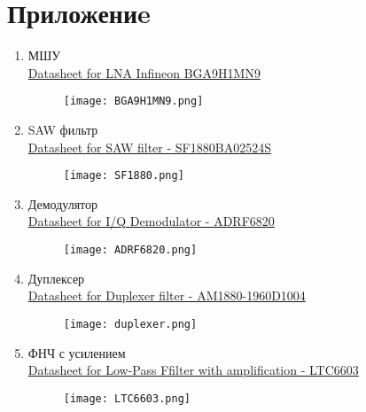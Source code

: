 \documentclass[a4paper,12pt]{article}
\begin{document}
 \newpage

\section{Приложениe}
\begin{enumerate}

\item  МШУ  \\
\href{https://www.alldatasheet.com/datasheet-pdf/view/1418778/INFINEON/BGA9H1MN9.html}{Datasheet for LNA Infineon BGA9H1MN9}
\begin{figure}[H]
    \centering
    \texttt{[image: BGA9H1MN9.png]}
    \label{fig:enter-label}
\end{figure}

\newpage

\item  SAW фильтр \\
\href{https://www.alldatasheet.com/datasheet-pdf/view/565351/APITECH/SF1880BA02524S.html}{Datasheet for SAW filter - SF1880BA02524S}
\begin{figure}[H]
    \centering
    \texttt{[image: SF1880.png]}
    \label{fig:enter-label}
\end{figure}


\newpage

\item  Демодулятор \\
\href{https://www.alldatasheet.com/html-pdf/902731/AD/ADRF6820ACPZ-R7/70/2/ADRF6820ACPZ-R7.html}{Datasheet for I/Q Demodulator  - ADRF6820}
\begin{figure}[H]
    \centering
    \texttt{[image: ADRF6820.png]}
    \label{fig:enter-label}
\end{figure}

\newpage

\item  Дуплексер \\
\href{https://www.everythingrf.com/products/duplexers/anatech-electronics/690-30-am1880-1960d1004}{Datasheet for Duplexer  filter - AM1880-1960D1004}
\begin{figure}[H]
    \centering
    \texttt{[image: duplexer.png]}
    \label{fig:enter-label}
\end{figure}

\newpage

\item  ФНЧ с усилением \\
\href{https://www.alldatasheet.com/html-pdf/265342/LINER/LTC6603/306/2/LTC6603.html}{Datasheet for Low-Pass Ffilter with amplification - 
LTC6603}
\begin{figure}[H]
    \centering
    \texttt{[image: LTC6603.png]}
    \label{fig:enter-label}
\end{figure}


\end{enumerate}
\end{document}
